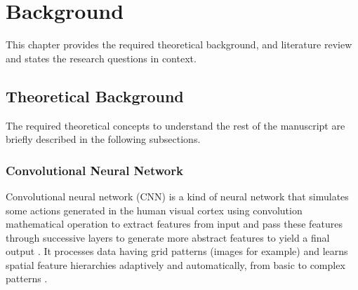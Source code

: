 \chapter{Background}\label{chap:background}

\begin{center}
	\begin{minipage}{0.8\textwidth}
		\begin{small}
			This chapter provides the required theoretical background, and literature review and states the research questions in context.
		\end{small}
	\end{minipage}
	\vspace{0.5cm}
\end{center}

\minitoc

\section{Theoretical Background}\label{sec:theobackground}
The required theoretical concepts to understand the rest of the manuscript are briefly described in the following subsections.

\subsection{Convolutional Neural Network}\label{sec:CNN}
Convolutional neural network (CNN) is a kind of neural network that simulates some actions generated in the human visual cortex using convolution mathematical operation to extract features from input and pass these features through successive layers to generate more abstract features to yield a final output \cite{726791}. It processes data having grid patterns (images for example) and learns spatial feature hierarchies adaptively and automatically, from basic to complex patterns \cite{yamashita2018convolutional}. 

